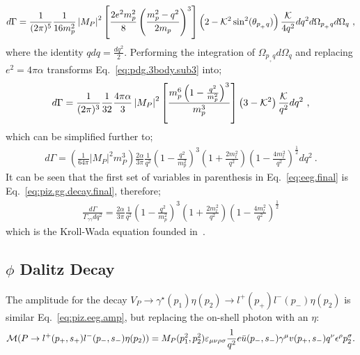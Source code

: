 \begin{align}\label{eq:pdg.3body.sub3}
d\Gamma = \frac{1}{(2 \pi)^5} \frac{1}{16 m_p^2} \left|M_{P}\right|^{2} \left[ \frac{2e^2 m_p^2}{8} \left( \frac{m_p^2 - q^2}{2 m_p}\right)^3\right]\left( 2 -{\cal K}^2\sin^2(\theta_{p_{_+}q})\right)\frac{{\cal K}}{4 q^2}dq^2d\Omega_{p_{_+}q}d\Omega_q \ ,
\end{align}
where the identity $qdq = \frac{dq^2}{2}$. Performing the integration of $\Omega_{p_{_+}q}d\Omega_q$ and replacing $e^2 = 4\pi\alpha$ transforms Eq.~\ref{eq:pdg.3body.sub3} into;
\begin{align}\label{eq:pdg.3body.sub4}
d\Gamma = \frac{1}{(2 \pi)^3} \frac{1}{32} \frac{4 \pi \alpha}{3} \left|M_{P}\right|^{2} \left[ \frac{m_p^6 \left( 1- \frac{q^2}{m_p^2}\right)^3}{m_p^3} \right]\left( 3 -{\cal K}^2\right)\frac{{\cal K}}{q^2}dq^2\ ,
\end{align}
which can be simplified further to;
\begin{align}\label{eq:eeg.final}
d\Gamma = \left(\frac{1}{64\pi} \left|M_{P}\right|^{2}m_{P}^{3} \right) \frac{2 \alpha}{3 \pi} \frac{1}{q^2} \left( 1- \frac{q^2}{m_p^2}\right)^3 \left( 1+ \frac{2m_l^2}{q^2}\right) \left( 1- \frac{4m_l^2}{q^2}\right)^{\frac{1}{2}} dq^2\ .
\end{align}
It can be seen that the first set of variables in parenthesis in Eq.~\ref{eq:eeg.final} is Eq.~\ref{eq:piz.gg.decay.final}, therefore;
\begin{align}\label{eq:eegff.finalkroll}
\frac{d\Gamma}{\Gamma_{\gamma\gamma} dq^2} = \frac{2 \alpha}{3 \pi} \frac{1}{q^2} \left( 1- \frac{q^2}{m_p^2}\right)^3 \left( 1+ \frac{2m_l^2}{q^2}\right) \left( 1- \frac{4m_l^2}{q^2}\right)^{\frac{1}{2}} 
\end{align}
which is the Kroll-Wada equation founded in~\cite{KrollWada}.
\subsection{$\phi$ Dalitz Decay}\label{sec:phidalitzdecay} 
The amplitude for the decay $V_P \to \gamma^\star(p_1) \eta(p_2) \to l^+(p_+)l^-(p_-) \eta(p_2)$ is similar Eq.~\ref{eq:piz.eeg.amp}, but replacing the on-shell photon with an $\eta$:
\begin{equation}\label{eq:phi.eeg.amp}
{\cal M}(P\to l^+(p_+,s_+)l^-(p_-,s_-) \eta(p_2)) = {M}_P(p_{1}^2,p_{2}^2) \varepsilon_{\mu\nu\rho\sigma} \frac{1}{q^2} e \bar u(p_-,s_-) \gamma^\mu v(p_+,s_-) q^\nu \epsilon^\rho p_{2}^\sigma.
\end{equation}
